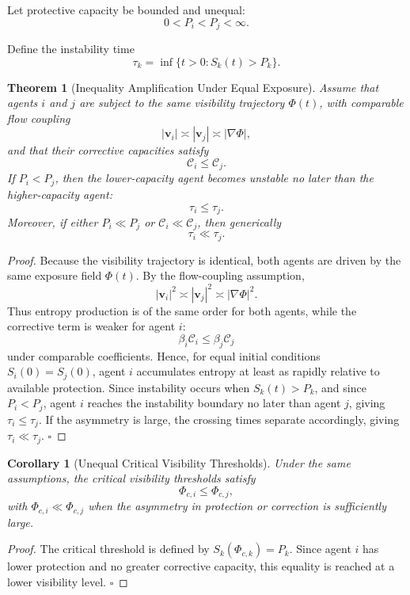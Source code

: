 \documentclass[12pt,a4paper]{article}
\newtheorem{theorem}{Theorem}
\newtheorem{corollary}{Corollary}[theorem]
\begin{document}
Let protective capacity be bounded and unequal:
\[
0 < P_i < P_j < \infty.
\]

Define the instability time
\[
\tau_k = \inf \{ t > 0 : S_k(t) > P_k \}.
\]

\begin{theorem}[Inequality Amplification Under Equal Exposure]
Assume that agents $i$ and $j$ are subject to the same visibility trajectory $\Phi(t)$, with comparable flow coupling
\[
|\mathbf{v}_i| \asymp |\mathbf{v}_j| \asymp |\nabla \Phi|,
\]
and that their corrective capacities satisfy
\[
\mathcal{C}_i \leq \mathcal{C}_j.
\]
If $P_i < P_j$, then the lower-capacity agent becomes unstable no later than the higher-capacity agent:
\[
\tau_i \leq \tau_j.
\]
Moreover, if either $P_i \ll P_j$ or $\mathcal{C}_i \ll \mathcal{C}_j$, then generically
\[
\tau_i \ll \tau_j.
\]
\end{theorem}

\begin{proof}
Because the visibility trajectory is identical, both agents are driven by the same exposure field $\Phi(t)$. By the flow-coupling assumption,
\[
|\mathbf{v}_i|^2 \asymp |\mathbf{v}_j|^2 \asymp |\nabla \Phi|^2.
\]
Thus entropy production is of the same order for both agents, while the corrective term is weaker for agent $i$:
\[
\beta_i \mathcal{C}_i \leq \beta_j \mathcal{C}_j
\]
under comparable coefficients. Hence, for equal initial conditions $S_i(0)=S_j(0)$, agent $i$ accumulates entropy at least as rapidly relative to available protection. Since instability occurs when $S_k(t) > P_k$, and since $P_i < P_j$, agent $i$ reaches the instability boundary no later than agent $j$, giving $\tau_i \leq \tau_j$. If the asymmetry is large, the crossing times separate accordingly, giving $\tau_i \ll \tau_j$. \hfill$\square$
\end{proof}

\begin{corollary}[Unequal Critical Visibility Thresholds]
Under the same assumptions, the critical visibility thresholds satisfy
\[
\Phi_{c,i} \leq \Phi_{c,j},
\]
with $\Phi_{c,i} \ll \Phi_{c,j}$ when the asymmetry in protection or correction is sufficiently large.
\end{corollary}

\begin{proof}
The critical threshold is defined by $S_k(\Phi_{c,k}) = P_k$. Since agent $i$ has lower protection and no greater corrective capacity, this equality is reached at a lower visibility level. \hfill$\square$
\end{proof}
\end{document}
